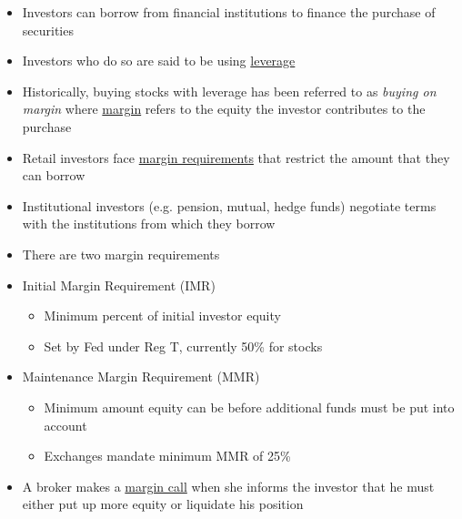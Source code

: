 \documentclass{beamer}
\begin{document}
\begin{frame}{}
\begin{itemize}
\item Investors can borrow from financial institutions to finance the purchase of securities
\item Investors who do so are said to be using \underline{leverage} 
\item Historically, buying stocks with leverage has been referred to as \textit{buying on margin} where \underline{margin} refers to the equity the investor contributes to the purchase
\end{itemize}
\end{frame}

\begin{frame}{}
\begin{itemize}
\item Retail investors face \underline{margin requirements} that restrict the amount that they can borrow
\item Institutional investors (e.g. pension, mutual, hedge funds) negotiate terms with the institutions from which they borrow
\item There are two margin requirements
\vfill
\item [1.] Initial Margin Requirement (IMR)
\begin{itemize}
\item Minimum percent of initial investor equity
\item Set by Fed under Reg T, currently 50\% for stocks
\end{itemize}
\item [2.] Maintenance Margin Requirement (MMR)
\begin{itemize}
\item Minimum amount equity can be before additional funds must be put into account
\item Exchanges mandate minimum MMR of 25\%
\end{itemize}
\vfill
\item A broker makes a \underline{margin call} when she informs the investor that he must either put up more equity or liquidate his position
\end{itemize}
\end{frame}
\end{document}
